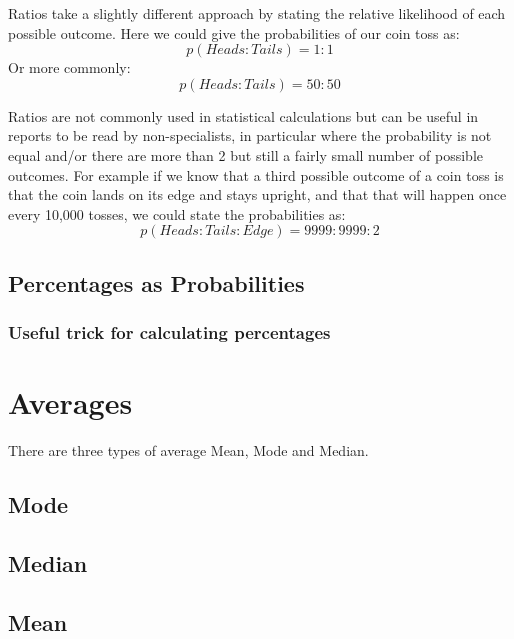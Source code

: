 Ratios take a slightly different approach by stating the relative likelihood of each possible outcome.  Here we could give the probabilities of our coin toss as:
\begin{equation}
p(Heads:Tails) = 1:1
\end{equation}
Or more commonly:
\begin{equation}
p(Heads:Tails) = 50:50
\end{equation}

Ratios are not commonly used in statistical calculations but can be useful in reports to be read by non-specialists, in particular where the probability is not equal and/or there are more than 2 but still a fairly small number of possible outcomes.  For example if we know that a third possible outcome of a coin toss is that the coin lands on its edge and stays upright, and that that will happen once every 10,000 tosses, we could state the probabilities as:
\begin{equation}
p(Heads:Tails:Edge) = 9999:9999:2
\end{equation}

\subsection{Percentages as Probabilities}


\subsubsection{Useful trick for calculating percentages}


\section{Averages}
There are three types of average Mean, Mode and Median.
\subsection{Mode}

\subsection{Median}

\subsection{Mean}


